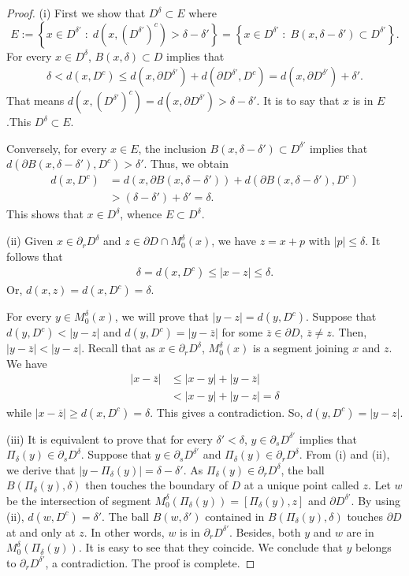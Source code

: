 \documentclass[reqno,11pt]{amsart}
\theoremstyle{definition}
\numberwithin{equation}{section}
\def\ov{\overline}
\newcommand{\1}{{{\bf 1}\kern-0,28em\rm l}}
\def\sepa{\; : \;}
\def\proj{\Pi}
\newcommand{\aco}[1]{\left\{#1\right\}}
\begin{document}
\begin{proof}
(i) First we  show that $D^\delta\subset E$ where 
 $$E:=\aco{ x\in D^{\delta'} \sepa d(x, (D^{\delta'})^c) > \delta-\delta' } =\aco{ x\in D^{\delta'} \sepa B(x,\delta-\delta') \subset D^{\delta'} }.$$
For every $x\in D^\delta$, $B(x,\delta)\subset D$ implies that
\begin{align*}
\delta < d(x,D^c) \le d(x,\partial D^{\delta'}) + d(\partial D^{\delta'}, D^c) = d(x,\partial D^{\delta'}) +\delta'.
\end{align*} 
That means $d(x,(D^{\delta'})^c) = d(x,\partial D^{\delta'}) > \delta-\delta'$. It is to say that $x$ is in $E$.This $D^\delta \subset E$.

Conversely, for every $x\in E$, the inclusion $B(x,\delta-\delta')\subset D^{\delta'}$ implies that $ d(\partial B(x,\delta-\delta'), D^c) >\delta'$. Thus, we obtain
\begin{align*}
d(x, D^c)
&= d(x,\partial B(x, \delta-\delta')) + d(\partial B(x,\delta-\delta'), D^c) \\
& > (\delta-\delta') + \delta' =\delta.
\end{align*}
This shows that $x\in D^{\delta}$, whence $E\subset D^{\delta}$. 

\medskip(ii) Given $x\in \partial_r D^{\delta}$ and $z\in\partial D\cap M_0^\delta(x)$, we have $z=x+p$ with $|p|\le \delta$. It follows that
\begin{align*}
\delta =d(x, D^c) \le |x - z| \le \delta.
\end{align*}
Or, $d(x,z)=d(x,D^c)=\delta$.

For every $y\in M_0^\delta(x)$, we will prove that $|y - z|=d(y, D^c)$. Suppose that $d(y,D^c) < |y - z|$ and $d(y, D^c)= |y - \ov z|$ for some $\ov z\in \partial D$, $\ov z\neq z$. Then, $|y - \ov z| < |y - z|$. Recall that as $x\in\partial_r D^\delta$, $M_0^\delta(x)$ is a segment joining $x$ and $z$. We have
\begin{align*}
|x - \ov z| &\le |x - y| + |y - \ov z| \\
&< |x - y| + |y - z| = \delta
\end{align*}
while $|x - \ov z| \ge d(x, D^c) =\delta$. This gives a contradiction. So, $d(y,D^c)= |y - z|$.

\medskip (iii) It is equivalent to prove that for every $\delta' <\delta$, $y\in\partial_s D^{\delta'}$ implies that $\proj_\delta (y) \in \partial_s D^\delta$. Suppose that $y\in \partial_s D^{\delta'}$ and $\proj_\delta (y)\in \partial_r D^\delta$. From (i) and (ii), we derive that $|y-\proj_\delta (y)|=\delta-\delta'$. As $\proj_\delta (y)\in \partial_r D^\delta$, the ball $B(\proj_\delta (y),\delta)$ then touches the boundary of $D$ at a unique point called $z$. Let $w$ be the intersection of segment $M_0^\delta(\proj_\delta (y))=[\proj_\delta (y),z]$ and $\partial D^{\delta'}$. By using (ii), $d(w,D^c)=\delta'$. The ball $B(w, \delta')$ contained in $B(\proj_\delta (y),\delta)$ touches $\partial D$ at and only at $z$. In other words, $w$ is in $\partial_r D^{\delta'}$. Besides, both $y$ and $w$ are in $M_0^\delta(\proj_\delta (y))$. It is easy to see that they coincide. We conclude that $y$ belongs to $\partial_r D^{\delta'}$, a contradiction. The proof is complete.
\end{proof}
\end{document}
